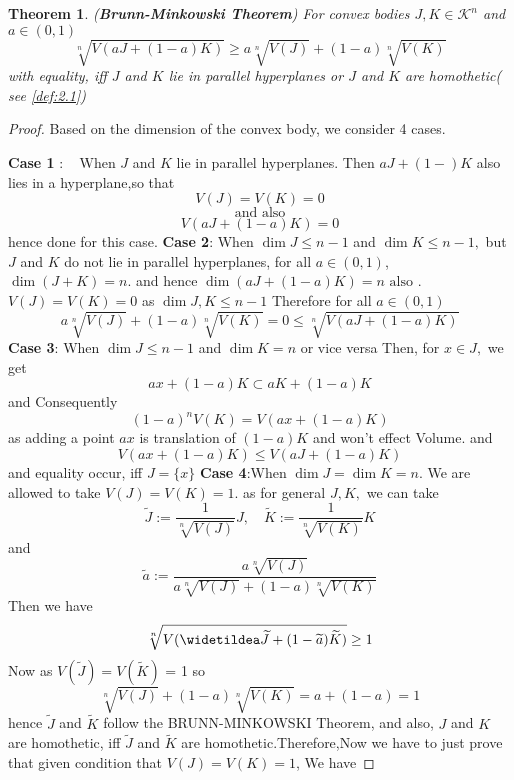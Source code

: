\documentclass[oneside]{book}
\newtheorem{theorem}{Theorem}[section]
\theoremstyle{definition}
\begin{document}
 \begin{theorem}(\textbf{Brunn-Minkowski Theorem})
 \label{thm:20}
For convex bodies $J, K \in \mathcal{K}^{n}$ and $a \in(0,1)$
\begin{equation}
\label{eq54}
\sqrt[n]{V(a J+(1-a) K)} \geq a \sqrt[n]{V(J)}+(1-a) \sqrt[n]{V(K)}
\end{equation} \label{eq:4.19}
with equality, iff $J$ and $K$ lie in parallel hyperplanes or $J$ and $K$ are homothetic( see \ref{def:2.1})
  \end{theorem}
\begin{proof}
Based on the dimension of the convex body, we consider 4 cases.
 \hfill \break
 
\textbf{Case 1} $: \quad \text{When } J$ and $K$ lie in parallel hyperplanes. Then  $a J+(1-) K$  also lies in a hyperplane,\quad so that $$V(J)=V(K)=0$$    $$\text{and also}$$ $$V(a J+(1-a) K)=0$$
 hence done for this case.
 \hfill \break
\textbf{Case 2}: \quad  When $\operatorname{dim} J \leq n-1$ and $\operatorname{dim} K \leq n-1,$ but $J$ and $K$ do not lie in parallel hyperplanes, for all $a \in(0,1)$, $\operatorname{dim}(J+K)=n .$ and hence  $\operatorname{dim}(a J+(1-a) K)=n \text{ also }.$ 
\hfill \break
$V(J) = V(K)= 0$ as $\operatorname{dim} J,K \leq n-1 $ Therefore for all $a \in(0,1)$
 $$
a \sqrt[n]{V(J)}+(1-a) \sqrt[n]{V(K)}=0 \leq \sqrt[n]{V(a J+(1-a) K)}
$$
\hfill \break
\textbf{Case 3}: \quad  When $\operatorname{dim } J \leq n-1$ and $\operatorname{dim} K=n$ or vice versa
\hfill \break 
Then, for $x \in J,$ we get
\[
a x+(1-a) K \subset a K+(1-a) K
\]
and Consequently
\[
(1-a)^{n} V(K)=V(a x+(1-a) K) 
\]
as adding a point $a x $ is translation of $(1-a) K$ and won't effect Volume. 
and
$$ V(a x+(1-a) K) \leq V(a 
J+(1-a) K)$$
and equality occur, iff $J=\{x\}$ 
\hfill \break
\textbf{Case 4}:When $\operatorname{dim} J=\operatorname{dim} K=n .$  We are allowed to take $V(J)=V(K)=1 .$ as for general $J, K,$  we  can take
\[
  \widetilde{J}:=\frac{1}{\sqrt[n]{V(J)}} J, \quad \widetilde{K}:=\frac{1}{\sqrt[n]{V(K)}} K
\]
and
\[
\widetilde{a}:=\frac{a \sqrt[n]{V(J)}}{a \sqrt[n]{V(J)}+(1-a) \sqrt[n]{V(K)}}
\]
Then we have
\[
    \sqrt[n]{V({\widetildea \widetilde{ J} }+(1-\widetilde{a}) \widetilde{K})} \geq 1
\]
Now  as $V(\widetilde{J}) = V(\widetilde{K})$ = 1 so $$\sqrt[n]{V(J)}+(1-a) \sqrt[n]{V(K)}=a+(1-a)=1$$
hence $\widetilde{J}$ and $\widetilde{K}$
follow the BRUNN-MINKOWSKI Theorem,  and also, $J$ and $K$ are homothetic, iff $\widetilde{J}$ and $\widetilde{K}$ are homothetic.Therefore,Now  we have to just prove that given condition that $V(J)=V(K)=1$, We have 

\end{proof}
\end{document}
